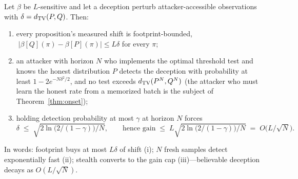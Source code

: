 \begin{theorem}\label{thm:patch}
Let $\beta$ be $L$-sensitive and let a deception perturb attacker-accessible
observations with $\delta=d_{\mathrm{TV}}(P,Q)$. Then:
\begin{enumerate}[label=(\roman*),leftmargin=2em]
\item every proposition's measured shift is footprint-bounded,
      $\;|\beta[Q](\pi)-\beta[P](\pi)|\le L\delta$ for every $\pi$;
\item an attacker with horizon $N$ who implements the optimal threshold test
      and knows the honest distribution $P$ detects the deception with
      probability at least $1-2e^{-N\delta^{2}/2}$, and no test exceeds
      $d_{\mathrm{TV}}(P^{N},Q^{N})$ (the attacker who must learn the honest rate from a
      memorized batch is the subject of Theorem~\ref{thm:onset});
\item holding detection probability at most $\gamma$ at horizon $N$ forces
      \[
      \delta\;\le\;\sqrt{2\ln\!\bigl(2/(1-\gamma)\bigr)/N},
      \qquad\text{hence gain}\;\le\;
      L\sqrt{2\ln\!\bigl(2/(1-\gamma)\bigr)/N}\;=\;O\bigl(L/\sqrt{N}\bigr).
      \]
\end{enumerate}
\end{theorem}

In words: footprint buys at most $L\delta$ of shift (i); $N$ fresh samples
detect exponentially fast (ii); stealth converts to the gain cap
(iii)---believable deception decays as $O(L/\sqrt{N})$.

